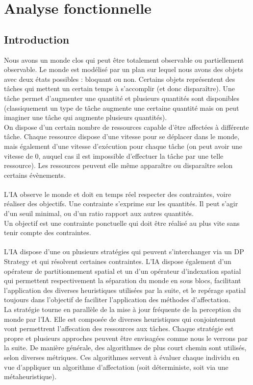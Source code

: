 \section{Analyse fonctionnelle}
\subsection{Introduction}
Nous avons un monde clos qui peut être totalement observable ou partiellement observable. Le monde est modélisé par un plan sur lequel nous avons des objets avec deux états possibles : bloquant ou non. Certains objets représentent des tâches qui mettent un certain temps à s'accomplir (et donc disparaître). Une tâche permet d'augmenter une quantité et plusieurs quantités sont disponibles (classiquement un type de tâche augmente une certaine quantité mais on peut imaginer une tâche qui augmente plusieurs quantités).\\
On dispose d'un certain nombre de ressources capable d'être affectées à différente tâche. Chaque ressource dispose d'une vitesse pour se déplacer dans le monde, mais également d'une vitesse d'exécution pour chaque tâche (on peut avoir une vitesse de 0, auquel cas il est impossible d'effectuer la tâche par une telle ressource). Les ressources peuvent elle même apparaître ou disparaître selon certains évènements.\\\\

L'IA observe le monde et doit en temps réel respecter des contraintes, voire réaliser des objectifs. Une contrainte s'exprime sur les quantités. Il peut s'agir d'un seuil minimal, ou d'un ratio rapport aux autres quantités.\\
Un objectif est une contrainte ponctuelle qui doit être réalisé au plus vite sans tenir compte des contraintes.\\\\

L'IA dispose d'une ou plusieurs stratégies qui peuvent s'interchanger via un DP Strategy et qui résolvent certaines contraintes.
L'IA dispose également d'un opérateur de partitionnement spatial et un d'un opérateur d'indexation spatial qui permettent respectivement la séparation du monde en sous blocs, facilitant l'application des diverses heuristiques utilisées par la suite, et le repérage spatial toujours dans l'objectif de faciliter l'application des méthodes d'affectation.\\

La stratégie tourne en parallèle de la mise à jour fréquente de la perception du monde par l'IA. Elle est composée de diverses heuristiques qui conjointement vont permettrent l'affecation des ressources aux tâches.
Chaque stratégie est propre et plusieurs approches peuvent être envisagées comme nous le verrons par la suite. De manière générale, des algorithmes de plus court chemin sont utilisés, selon diverses métriques. Ces algorithmes servent à évaluer chaque individu en vue d'appliquer un algorithme d'affectation (soit déterministe, soit via une métaheuristique).\\\\

